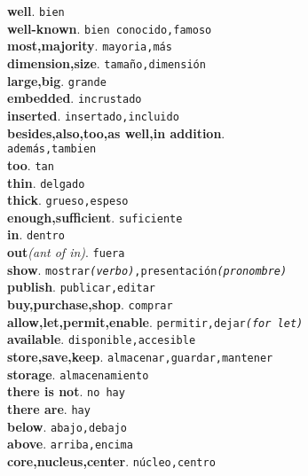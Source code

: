 \documentclass[twocolumn]{article}
\begin{document}
	\textsf{\textbf{well}}. \texttt{bien}\\
	\textsf{\textbf{well-known}}. \texttt{bien conocido,famoso}\\
	\textsf{\textbf{most,majority}}. \texttt{mayoria,m\'as}\\
	\textsf{\textbf{dimension,size}}. \texttt{tama\~no,dimensi\'on}\\
	\textsf{\textbf{large,big}}. \texttt{grande}\\
	\textsf{\textbf{embedded}}. \texttt{incrustado}\\
	\textsf{\textbf{inserted}}. \texttt{insertado,incluido}\\
	\textsf{\textbf{besides,also,too,as well,in addition}}.\\\texttt{adem\'as,tambien}\\
	\textsf{\textbf{too}}. \texttt{tan}\\
	\textsf{\textbf{thin}}. \texttt{delgado}\\
	\textsf{\textbf{thick}}. \texttt{grueso,espeso}\\
	\textsf{\textbf{enough,sufficient}}. \texttt{suficiente}\\
	\textsf{\textbf{in}}. \texttt{dentro}\\
	\textsf{\textbf{out}}{\scriptsize \textit{(ant of in)}}. \texttt{fuera}\\
	\textsf{\textbf{show}}. \texttt{mostrar{\scriptsize \textit{(verbo)}},presentaci\'on{\scriptsize \textit{(pronombre)}}}\\
	\textsf{\textbf{publish}}. \texttt{publicar,editar}\\
	\textsf{\textbf{buy,purchase,shop}}. \texttt{comprar}\\
	\textsf{\textbf{allow,let,permit,enable}}. \texttt{permitir,dejar{\scriptsize \textit{(for let)}}}\\
	\textsf{\textbf{available}}. \texttt{disponible,accesible}\\
	\textsf{\textbf{store,save,keep}}. \texttt{almacenar,guardar,mantener}\\
	\textsf{\textbf{storage}}. \texttt{almacenamiento}\\
	\textsf{\textbf{there is not}}. \texttt{no hay}\\
	\textsf{\textbf{there are}}. \texttt{hay}\\
	\textsf{\textbf{below}}. \texttt{abajo,debajo}\\
	\textsf{\textbf{above}}. \texttt{arriba,encima}\\
	\textsf{\textbf{core,nucleus,center}}. \texttt{n\'ucleo,centro}\\
\end{document}
